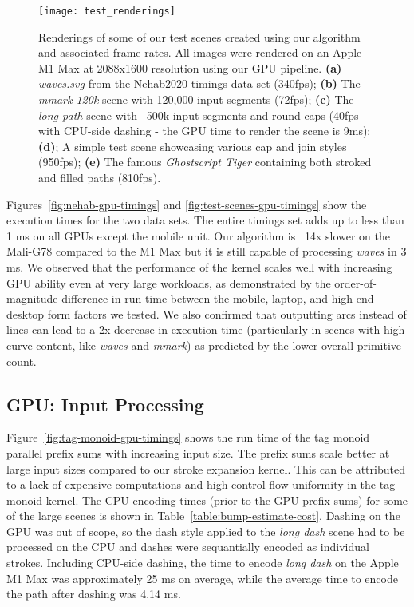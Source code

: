 \documentclass[sigconf]{acmart}
\begin{document}
\begin{figure}
    \centering
    \texttt{[image: test\_renderings]}
    \caption{Renderings of some of our test scenes created using our algorithm and associated frame rates. All images were rendered on an Apple M1 Max at 2088x1600 resolution using our GPU pipeline. \textbf{(a)} \emph{waves.svg} from the Nehab2020 timings data set (340fps); \textbf{(b)} The \emph{mmark-120k} scene with 120,000 input segments (72fps); \textbf{(c)} The \emph{long path} scene with ~500k input segments and round caps (40fps with CPU-side dashing - the GPU time to render the scene is 9ms); \textbf{(d)}; A simple test scene showcasing various cap and join styles (950fps); \textbf{(e)} The famous \emph{Ghostscript Tiger} containing both stroked and filled paths (810fps).}
    \label{fig:renderings}
\end{figure}

Figures~\ref{fig:nehab-gpu-timings} and \ref{fig:test-scenes-gpu-timings} show the execution times for the two data sets. The entire \citet{Nehab2020} timings set adds up to less than 1 ms on all GPUs except the mobile unit. Our algorithm is ~14x slower on the Mali-G78 compared to the M1 Max but it is still capable of processing \emph{waves} in 3 ms. We observed that the performance of the kernel scales well with increasing GPU ability even at very large workloads, as demonstrated by the order-of-magnitude difference in run time between the mobile, laptop, and high-end desktop form factors we tested. We also confirmed that outputting arcs instead of lines can lead to a 2x decrease in execution time (particularly in scenes with high curve content, like \emph{waves} and \emph{mmark}) as predicted by the lower overall primitive count.

\subsection{GPU: Input Processing} \label{subsection:encoding-results}

Figure~\ref{fig:tag-monoid-gpu-timings} shows the run time of the tag monoid parallel prefix sums with increasing input size. The prefix sums scale better at large input sizes compared to our stroke expansion kernel. This can be attributed to a lack of expensive computations and high control-flow uniformity in the tag monoid kernel. The CPU encoding times (prior to the GPU prefix sums) for some of the large scenes is shown in Table~\ref{table:bump-estimate-cost}. Dashing on the GPU was out of scope, so the dash style applied to the \emph{long dash} scene had to be processed on the CPU and dashes were sequantially encoded as individual strokes. Including CPU-side dashing, the time to encode \emph{long dash} on the Apple M1 Max was approximately 25 ms on average, while the average time to encode the path after dashing was 4.14 ms.
\end{document}
